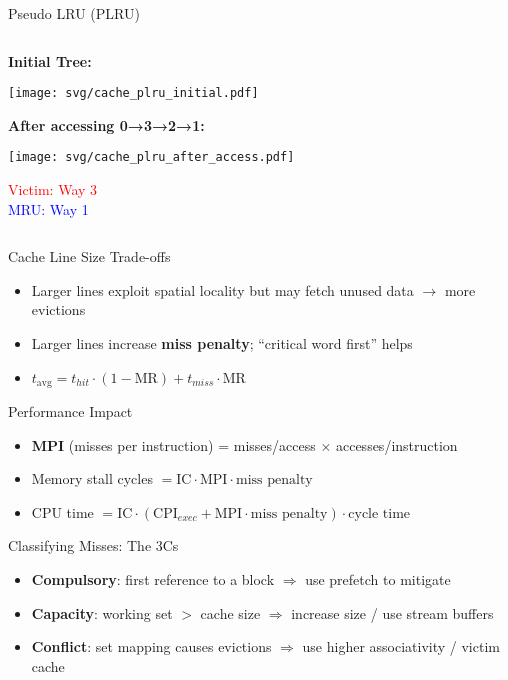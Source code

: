 \documentclass[aspectratio=169,12pt]{beamer}
\begin{document}
\begin{frame}{Pseudo LRU (PLRU)}
\begin{columns}
\begin{column}{0.25\textwidth}
\centering
\vspace{-0.5cm}

\textbf{Initial Tree:}

\texttt{[image: svg/cache\_plru\_initial.pdf]}

\vspace{0.3cm}

\textbf{After accessing 0→3→2→1:}

\texttt{[image: svg/cache\_plru\_after\_access.pdf]}

\vspace{0.2cm}
\small
\textcolor{red}{Victim: Way 3} \\
\textcolor{blue}{MRU: Way 1}
\end{column}
\end{columns}
\end{frame}

\begin{frame}{Cache Line Size Trade-offs}
\begin{itemize}
  \item Larger lines exploit spatial locality but may fetch unused data $\rightarrow$ more evictions
  \item Larger lines increase \textbf{miss penalty}; ``critical word first'' helps
  \item $t_{\text{avg}} = t_{hit}\cdot(1-\text{MR}) + t_{miss}\cdot \text{MR}$
\end{itemize}
\end{frame}

\begin{frame}{Performance Impact}
\begin{itemize}
  \item \textbf{MPI} (misses per instruction) = misses/access $\times$ accesses/instruction
  \item Memory stall cycles $= \text{IC}\cdot \text{MPI}\cdot \text{miss penalty}$
  \item CPU time $= \text{IC}\cdot(\text{CPI}_{exec}+\text{MPI}\cdot \text{miss penalty})\cdot \text{cycle time}$
\end{itemize}
\end{frame}

\begin{frame}{Classifying Misses: The 3Cs}
\begin{itemize}
  \item \textbf{Compulsory}: first reference to a block $\Rightarrow$ use prefetch to mitigate
  \item \textbf{Capacity}: working set $>$ cache size $\Rightarrow$ increase size / use stream buffers
  \item \textbf{Conflict}: set mapping causes evictions $\Rightarrow$ use higher associativity / victim cache
\end{itemize}
\end{frame}
\end{document}
